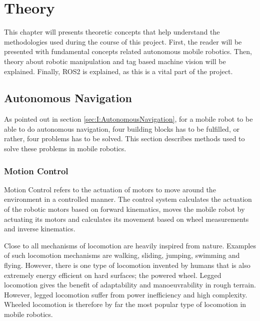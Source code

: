 \chapter{Theory}
This chapter will presents theoretic concepts that help understand the methodologies used during the course of this project. First, the reader will be presented with fundamental concepts related autonomous mobile robotics. Then, theory about robotic manipulation and tag based machine vision will be explained. Finally, ROS2 is explained, as this is a vital part of the project.

\section{Autonomous Navigation}
As pointed out in section \ref{sec:I:AutonomousNavigation}, for a mobile robot to be able to do autonomous navigation, four building blocks has to be fulfilled, or rather, four problems has to be solved. This section describes methods used to solve these problems in mobile robotics.

\subsection{Motion Control}
Motion Control refers to the actuation of motors to move around the environment in a controlled manner. The control system calculates the actuation of the robotic motors based on forward kinematics, moves the mobile robot by actuating its motors and calculates its movement based on wheel measurements and inverse kinematics.

Close to all mechanisms of locomotion are heavily inspired from nature. Examples of such locomotion mechanisms are walking, sliding, jumping, swimming and flying. However, there is one type of locomotion invented by humans that is also extremely energy efficient on hard surfaces; the powered wheel. Legged locomotion gives the benefit of adaptability and manoeuvrability in rough terrain. However, legged locomotion suffer from power inefficiency and high complexity. Wheeled locomotion is therefore by far the most popular type of locomotion in mobile robotics\cite{SiegwartRoland2011Itam}.

